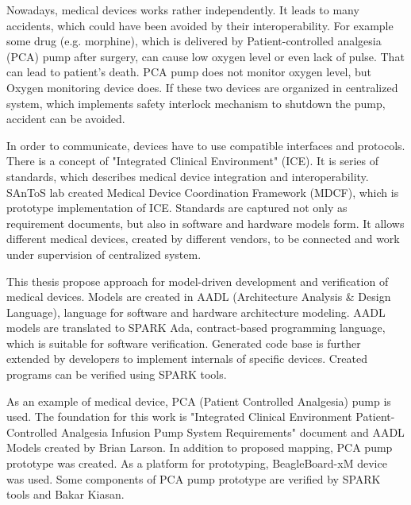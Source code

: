 
\pagestyle{empty}
\setlength{\baselineskip}{0.8cm}

\indent


Nowadays, medical devices works rather independently. It leads to many accidents, which could have been avoided by their interoperability. For example some drug (e.g. morphine), which is delivered by Patient-controlled analgesia (PCA) pump after surgery, can cause low oxygen level or even lack of pulse. That can lead to patient's death. PCA pump does not monitor oxygen level, but Oxygen monitoring device does. If these two devices are organized in centralized system, which implements safety interlock mechanism to shutdown the pump, accident can be avoided. 

In order to communicate, devices have to use compatible interfaces and protocols. There is a concept of "Integrated Clinical Environment" (ICE). It is series of standards, which describes medical device integration and interoperability. SAnToS lab created Medical Device Coordination Framework (MDCF), which is prototype implementation of ICE. Standards are captured not only as requirement documents, but also in software and hardware models form. It allows different medical devices, created by different vendors, to be connected and work under supervision of centralized system.

This thesis propose approach for model-driven development and verification of medical devices. Models are created in AADL (Architecture Analysis \& Design Language), language for software and hardware architecture modeling. AADL models are translated to SPARK Ada, contract-based programming language, which is suitable for software verification. Generated code base is further extended by developers to implement internals of specific devices. Created programs can be verified using SPARK tools.

As an example of medical device, PCA (Patient Controlled Analgesia) pump is used. The foundation for this work is "Integrated Clinical Environment Patient-Controlled Analgesia Infusion Pump System Requirements" document \cite{PcaReq} and AADL Models created by Brian Larson. In addition to proposed mapping, PCA pump prototype was created. As a platform for prototyping, BeagleBoard-xM device was used. Some components of PCA pump prototype are verified by SPARK tools and Bakar Kiasan.
